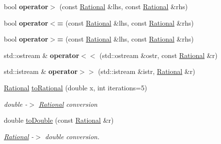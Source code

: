 \begin{DoxyCompactItemize}
bool {\bfseries operator$>$} (const \mbox{\hyperlink{classRational}{Rational}} \&lhs, const \mbox{\hyperlink{classRational}{Rational}} \&rhs)
\item 
\mbox{\label{group__general_ga7b99e5d0faa3459356ab1249e3315ceb}} 
bool {\bfseries operator$<$=} (const \mbox{\hyperlink{classRational}{Rational}} \&lhs, const \mbox{\hyperlink{classRational}{Rational}} \&rhs)
\item 
\mbox{\label{group__general_gac1e651cdae26413046d477efdaef0539}} 
bool {\bfseries operator$>$=} (const \mbox{\hyperlink{classRational}{Rational}} \&lhs, const \mbox{\hyperlink{classRational}{Rational}} \&rhs)
\item 
\mbox{\label{group__general_ga5cf9ab392de156c39a5a115c9b30607b}} 
std\+::ostream \& {\bfseries operator$<$$<$} (std\+::ostream \&ostr, const \mbox{\hyperlink{classRational}{Rational}} \&r)
\item 
\mbox{\label{group__general_gaa682331c9d58a26ba320d6414d396a9f}} 
std\+::istream \& {\bfseries operator$>$$>$} (std\+::istream \&istr, \mbox{\hyperlink{classRational}{Rational}} \&r)
\item 
\mbox{\label{group__general_ga0bfbe45cc727920e5a74e3a75ab2e6b9}} 
\mbox{\hyperlink{classRational}{Rational}} \mbox{\hyperlink{group__general_ga0bfbe45cc727920e5a74e3a75ab2e6b9}{to\+Rational}} (double x, int iterations=5)
\begin{DoxyCompactList}\small\item\em double -\/$>$ \mbox{\hyperlink{classRational}{Rational}} conversion \end{DoxyCompactList}\item 
\mbox{\label{group__general_ga95b1b3230673ab78c01058a88a5e3eae}} 
double \mbox{\hyperlink{group__general_ga95b1b3230673ab78c01058a88a5e3eae}{to\+Double}} (const \mbox{\hyperlink{classRational}{Rational}} \&r)
\begin{DoxyCompactList}\small\item\em \mbox{\hyperlink{classRational}{Rational}} -\/$>$ double conversion. \end{DoxyCompactList}\item 
\mbox{\label{group__general_ga2ae32e90a2bacd18ca646568cb6c456e}} 

\end{DoxyCompactItemize}
